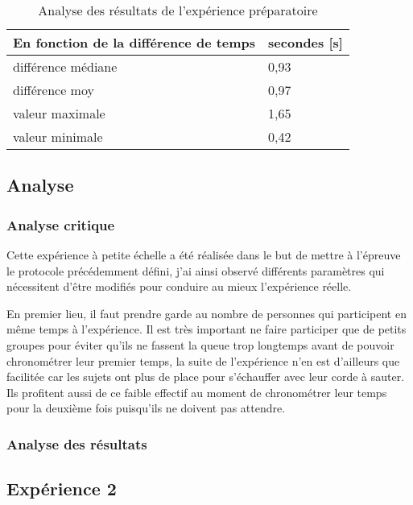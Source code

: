 \documentclass[12pt,fleqn,oneside,openany]{book} %
\begin{document}
\begin{table}[h]
	\centering
	\caption{Analyse des résultats de l'expérience préparatoire} \label{tbl:exp2.1}
	\begin{tabular}{ll}
		\toprule 
		\textbf{En fonction de la différence de temps} & \textbf{secondes [s]} \\ \midrule
		différence médiane & 0,93 \\
		différence moy & 0,97 \\
		valeur maximale & 1,65 \\
		valeur minimale & 0,42 \\ \bottomrule
	\end{tabular}
\end{table}

\subsection{Analyse} \label{ssec:analyse2.1}

\subsubsection{Analyse critique} \label{sssec:analyseCrit2.1}
Cette expérience à petite échelle a été réalisée dans le but de mettre à l'épreuve le protocole précédemment défini, j'ai ainsi observé différents paramètres qui nécessitent d'être modifiés pour conduire au mieux l'expérience réelle. 

En premier lieu, il faut prendre garde au nombre de personnes qui participent en même temps à l'expérience. Il est très important ne faire participer que de petits groupes pour éviter qu'ils ne fassent la queue trop longtemps avant de pouvoir chronométrer leur premier temps, la suite de l'expérience n'en est d'ailleurs que facilitée car les sujets ont plus de place pour s'échauffer avec leur corde à sauter. Ils profitent aussi de ce faible effectif au moment de chronométrer leur temps pour la deuxième fois puisqu'ils ne doivent pas attendre.

\subsubsection{Analyse des résultats} \label{sssec:analyseResult2.1}

\subsection{Expérience 2} \label{ssec:but2.2}
\end{document}
